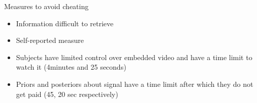 \documentclass[10pt]{beamer}
\begin{document}
\begin{frame}{Measures to avoid cheating}
\label{cheating}
	\begin{itemize}
	    \item Information difficult to retrieve
		\item Self-reported measure
		\item Subjects have limited control over embedded video and have a time limit to watch it (4minutes and 25 seconds)
		\item Priors and posteriors about signal have a time limit after which they do not get paid (45, 20 sec respectively)
	\end{itemize}
 \hfill \hyperlink{Video_info}{}

\end{frame}
\end{document}
